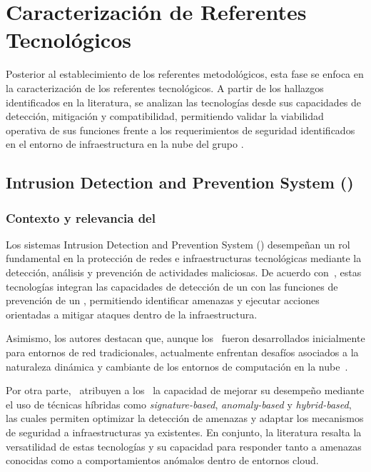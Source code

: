 
\section{Caracterización de Referentes Tecnológicos}

Posterior al establecimiento de los referentes metodológicos, esta fase se enfoca en la caracterización de los referentes tecnológicos. A 
partir de los hallazgos identificados en la literatura, se analizan las tecnologías desde sus capacidades de detección, mitigación y 
compatibilidad, permitiendo validar la viabilidad operativa de sus funciones frente a los requerimientos de seguridad identificados en el 
entorno de infraestructura en la nube del grupo \GRID.\@

\subsection{Intrusion Detection and Prevention System (\IDPS)}

\subsubsection{Contexto y relevancia del \IDPS}

Los sistemas Intrusion Detection and Prevention System (\IDPS) desempeñan un rol fundamental en la protección de redes e infraestructuras 
tecnológicas mediante la detección, análisis y prevención de actividades maliciosas. De acuerdo con~\cite{nasim2025idps}, estas tecnologías 
integran las capacidades de detección de un \IDS con las funciones de prevención de un \IPS, permitiendo identificar amenazas y ejecutar 
acciones orientadas a mitigar ataques dentro de la infraestructura.

Asimismo, los autores destacan que, aunque los \IDPS\ fueron desarrollados inicialmente para entornos de red tradicionales, actualmente 
enfrentan desafíos asociados a la naturaleza dinámica y cambiante de los entornos de computación en la nube~\cite{nasim2025idps}.

Por otra parte,~\cite{vaneeta2025idps} atribuyen a los \IDPS\ la capacidad de mejorar su desempeño mediante el uso de técnicas híbridas 
como \textit{signature-based}, \textit{anomaly-based} y \textit{hybrid-based}, las cuales permiten optimizar la detección de amenazas y 
adaptar los mecanismos de seguridad a infraestructuras ya existentes. En conjunto, la literatura resalta la versatilidad de estas 
tecnologías y su capacidad para responder tanto a amenazas conocidas como a comportamientos anómalos dentro de entornos cloud.

